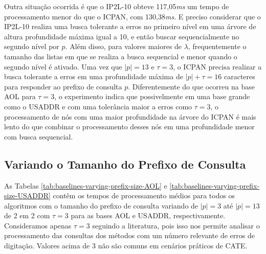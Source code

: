Outra situação ocorrida é que o IP2L-10 obteve 117,05\textit{ms} um tempo de processamento menor do que o ICPAN, com 130,38\textit{ms}. E preciso considerar que o IP2L-10 realiza uma busca tolerante a erros no primeiro nível em uma árvore de altura profundidade máxima igual a 10, e então buscar sequencialmente no segundo nível por $p$. Além disso, para valores maiores de $\lambda$, frequentemente o tamanho das listas em que se realiza a busca sequencial e menor quando o segundo nível é ativado. Uma vez que $|p|=13$ e $\tau=3$, o ICPAN precisa realizar a busca tolerante a erros em uma profundidade máxima de $|p| + \tau = 16$ caracteres para responder ao prefixo de consulta $p$. Diferentemente do que ocorreu na base AOL para $\tau=3$, o experimento indica que possivelmente em uma base grande como o USADDR e com uma tolerância maior a erros como $\tau=3$, o processamento de nós com uma maior profundidade na árvore do ICPAN é mais lento do que combinar o processamento desses nós em uma profundidade menor com busca sequencial.


\subsection{Variando o Tamanho do Prefixo de Consulta}

As Tabelas \ref{tab:baselines-varying-prefix-size-AOL} e \ref{tab:baselines-varying-prefix-size-USADDR} contêm os tempos de processamento médios para todos os algoritmos com o tamanho do prefixo de consulta variando de $|p|=3$ até $|p|=13$ de 2 em 2 com $\tau=3$ para as bases AOL e USADDR, respectivamente. Consideramos apenas $\tau=3$ seguindo a literatura, pois isso nos permite analisar o processamento das consultas dos métodos com um número relevante de erros de digitação. Valores acima de 3 não são comuns em cenários práticos de CATE.

